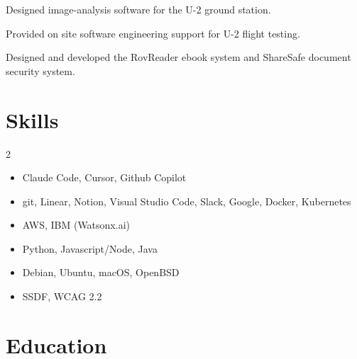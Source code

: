 \documentclass[letterpaper,10pt]{article}
\begin{document}
  \begin{resume_list}
    \item Designed image-analysis software for the U-2 ground station.
    \item Provided on site software engineering support for U-2 flight testing.
  \end{resume_list}
  
  \begin{resume_list}
      \item Designed and developed the RovReader ebook system and ShareSafe document security system.
  \end{resume_list}


    \section{Skills}

    \begin{multicols}{2}
        \begin{itemize}[itemsep=-2px, parsep=1pt, leftmargin=75pt]
        \item[\textbf{AI}] Claude Code, Cursor, Github Copilot
        \item[\textbf{Tools}] git, Linear, Notion, Visual Studio Code, Slack, Google, Docker, Kubernetes 
        \item[\textbf{Cloud}] AWS, IBM (Watsonx.ai)
        \item[\textbf{Languages}] Python, Javascript/Node, Java
        \item[\textbf{OS}] Debian, Ubuntu, macOS, OpenBSD
        \item[\textbf{Policies}] SSDF, WCAG 2.2
        \end{itemize}
    \end{multicols}
  

  \section{Education}

\end{document}
